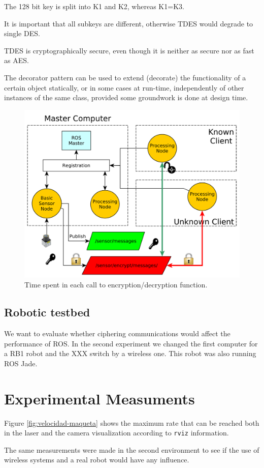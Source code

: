 \documentclass[journal,twoside]{JoPhA}
\begin{document}
The 128 bit key is split into K1 and K2, whereas K1=K3.

It is important that all subkeys are different, otherwise TDES would degrade to single DES.

TDES is cryptographically secure, even though it is neither as secure nor as fast as AES.


The decorator pattern can be used to extend (decorate) the functionality of a certain object statically, or in some cases at run-time, independently of other instances of the same class, provided some groundwork is done at design time. 

\begin{figure}[ht]
    \centering
    \includegraphics[width=.5\textwidth]{TestBed.pdf}
    \caption{Time spent in each call to encryption/decryption function.}
  \label{fig:TestBed}
\end{figure}







\subsection{Robotic testbed}

We want to evaluate whether ciphering communications would affect the performance of ROS. 
In the second experiment we changed the first computer for a RB1 robot and the XXX switch by a wireless one. This robot was also running ROS Jade.



\section{Experimental Measuments}

Figure \ref{fig:velocidad-maqueta} shows the maximum rate that can be reached both in the laser and the camera visualization according to \texttt{rviz} information.

The same measurements were made in the second environment to see if the use of wireless systems and a real robot would have any influence.
\end{document}
